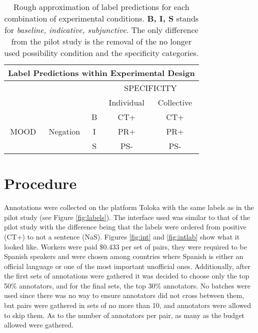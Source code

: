 \begin{table}
\centering
\begin{tabular}{|c|c|c|c|c|}
\hline
\multicolumn{5}{|c|}{Label Predictions within Experimental Design}\\\hline
                      & & &\multicolumn{2}{c|}{SPECIFICITY} \\\hline
                      & & & Individual & Collective\\\cline{4-5} 
\multirow{3}{*}{MOOD} & \multirow{3}{*}{Negation} & B & CT+ & CT+ \\\cline{3-5}
                      &                           & I & PR+& PR+ \\\cline{3-5}
                      &                           & S & PS- & PS-\\\hline                                                                           
\end{tabular}
\caption[Label predictions.]{Rough approximation of label predictions for each combination of experimental conditions. \textbf{B, I, S} stands for \textit{baseline, indicative, subjunctive}. The only difference from the pilot study is the removal of the no longer used possibility condition and the specificity categories.}
\label{tab:predict}
\end{table}

\section{Procedure}\label{sect:proc}
Annotations were collected on the platform Toloka \citep{Pavlichenko2021crowdspeech} with the same labels as in the pilot study (see Figure \ref{fig:labels}). The interface used was similar to that of the pilot study with the difference being that the labels were ordered from positive (CT+) to not a sentence (NaS). Figures \ref{fig:int} and \ref{fig:intlab} show what it looked like. Workers were paid $\$0.433$ per set of pairs, they were required to be Spanish speakers and were chosen among countries where Spanish is either an official language or one of the most important unofficial ones. Additionally, after the first sets of annotations were gathered it was decided to choose only the top 50\% annotators, and for the final sets, the top 30\% annotators. No batches were used since there was no way to ensure annotators did not cross between them, but pairs were gathered in sets of no more than 10, and annotators were allowed to skip them. As to the number of annotators per pair, as many as the budget allowed were gathered.\\

